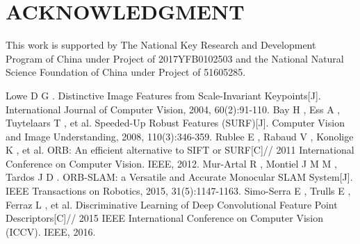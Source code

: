 \documentclass{svproc}
\begin{document}
\section*{ACKNOWLEDGMENT}

This work is supported by The National Key Research and Development Program of China under Project of 2017YFB0102503 and the National Natural Science Foundation of China under Project of 51605285.




\begin{thebibliography}{99}









 Lowe D G . Distinctive Image Features from Scale-Invariant Keypoints[J]. International Journal of Computer Vision, 2004, 60(2):91-110.
 Bay H , Ess A , Tuytelaars T , et al. Speeded-Up Robust Features (SURF)[J]. Computer Vision and Image Understanding, 2008, 110(3):346-359.
 Rublee E , Rabaud V , Konolige K , et al. ORB: An efficient alternative to SIFT or SURF[C]// 2011 International Conference on Computer Vision. IEEE, 2012.
 Mur-Artal R , Montiel J M M , Tardos J D . ORB-SLAM: a Versatile and Accurate Monocular SLAM System[J]. IEEE Transactions on Robotics, 2015, 31(5):1147-1163.
 Simo-Serra E , Trulls E , Ferraz L , et al. Discriminative Learning of Deep Convolutional Feature Point Descriptors[C]// 2015 IEEE International Conference on Computer Vision (ICCV). IEEE, 2016.



\end{thebibliography}
\end{document}
